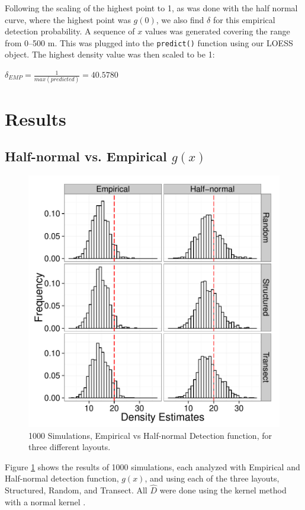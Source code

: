 \documentclass[12pt]{article}
\begin{document}
Following the scaling of the highest point to 1, as was done with the half normal curve, where the highest point was $g(0)$, we also find $\delta$ for this empirical detection probability. A sequence of $x$ values was generated covering the range from 0--500 m. This was plugged into the \texttt{predict()} function using our LOESS object. The highest density value was then scaled to be 1:

$\delta_{EMP}=\frac{1}{max(predicted)}=40.5780$ 

\section{Results}
\subsection{Half-normal vs. Empirical $g(x)$}
\begin{figure}

	\includegraphics[width=\textwidth]{../images/Emp_Vs_Hnorm.pdf}
	\caption{1000 Simulations, Empirical vs Half-normal Detection function, for three different layouts. \label{fig:sim1}}
		
\end{figure}
Figure \ref{fig:sim1} shows the results of 1000 simulations, each analyzed with Empirical and Half-normal detection function, $g(x)$, and using each of the three layouts, Structured, Random, and Transect. All $\hat{D}$  were done using the kernel method with a normal kernel \parencite{quang1993}.
\end{document}
